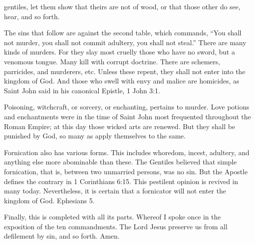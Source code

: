 gentiles, let them show that theirs are not of wood, or that those other do see, hear, and so forth.

The sins that follow are against the second table, which commands, “You shall not murder, you shall not commit adultery, you shall not steal.” There are many kinds of murders. For they slay most cruelly those who have no sword, but a venomous tongue. Many kill with corrupt doctrine. There are schemers, parricides, and murderers, etc. Unless these repent, they shall not enter into the kingdom of God. And those who swell with envy and malice are homicides, as Saint John said in his canonical Epistle, 1 John 3:1.

Poisoning, witchcraft, or sorcery, or enchanting, pertains to murder. Love potions and enchantments were in the time of Saint John most frequented throughout the Roman Empire; at this day those wicked arts are renewed. But they shall be punished by God, so many as apply themselves to the same.

Fornication also has various forms. This includes whoredom, incest, adultery, and anything else more abominable than these. The Gentiles believed that simple fornication, that is, between two unmarried persons, was no sin. But the Apostle defines the contrary in 1 Corinthians 6:15. This pestilent opinion is revived in many today. Nevertheless, it is certain that a fornicator will not enter the kingdom of God. Ephesians 5.

Finally, this is completed with all its parts. Whereof I spoke once in the exposition of the ten commandments. The Lord Jesus preserve us from all defilement by sin, and so forth. Amen.
